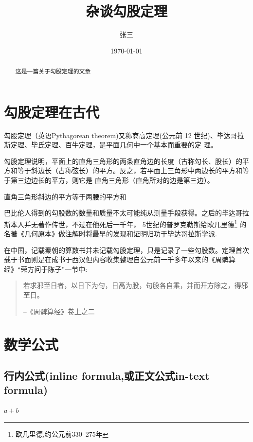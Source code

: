 \documentclass[UTF8]{ctexart}
\title{杂谈勾股定理}
\author{张三}
\date{\today}
\begin{document}
  \maketitle %
  \begin{abstract}
    这是一篇关于勾股定理的文章
  \end{abstract}
  \tableofcontents %
  \section{勾股定理在古代}
    勾股定理（英语Pythagorean theorem)又称商高定理(公元前 12 世纪)、毕达哥拉斯定理、毕氏定理、百牛定理，是平面几何中一个基本而重要的定 理。\cite{Kline}

    勾股定理说明，平面上的直角三角形的两条直角边的长度（古称勾长、股长）的平方和等于斜边长（古称弦长）的平方。反之，若平面上三角形中两边长的平方和等于第三边边长的平方，则它是
    直角三角形（直角所对的边是第三边）。\cite{quanjing}

    \begin{thm}[勾股定理]
      直角三角形斜边的平方等于两腰的平方和
    \end{thm}

    巴比伦人得到的勾股数的数量和质量不太可能纯从测量手段获得。之后的毕达哥拉斯本人并无著作传世，不过在他死后一千年，
    5世纪的普罗克勒斯给欧几里德\footnote{欧几里德,约公元前330--275年}
    的名著《几何原本》做注解时将最早的发现和证明归功于毕达哥拉斯学派.

    在中国，记载秦朝的算数书并未记载勾股定理，只是记录了一些勾股数。定理首次载于书面则是在成书于西汉但内容收集整理自公元前一千多年以来的《周髀算经》“荣方问于陈子”一节中:
    \begin{quote}%
    \kaishu%
      若求邪至日者，以日下为句，日高为股，句股各自乘，并而开方除之，得邪至日。

      --《周髀算经》卷上之二
    \end{quote}

  \section{数学公式}
    \subsection{行内公式(inline formula,或正文公式in-text formula)}
      $a+b$
\end{document}
